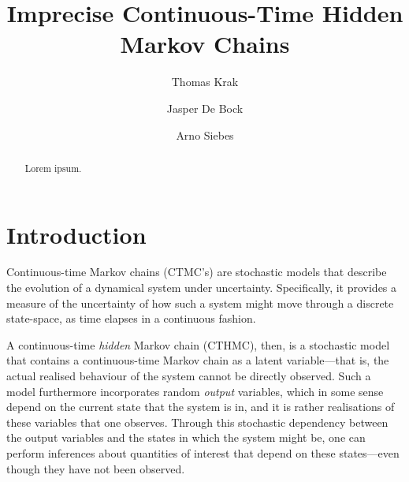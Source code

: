 \documentclass[twoside,11pt]{article}
\title{Imprecise Continuous-Time Hidden Markov Chains}
\author{Thomas Krak \and Jasper De Bock \and Arno Siebes}
\begin{document}


\date{}
\maketitle



\begin{abstract}
Lorem ipsum.
\end{abstract}

\section{Introduction}\label{sec:introduction}

Continuous-time Markov chains (CTMC's) are stochastic models that describe the evolution of a dynamical system under uncertainty. Specifically, it provides a measure of the uncertainty of how such a system might move through a discrete state-space, as time elapses in a continuous fashion.

A continuous-time \emph{hidden} Markov chain (CTHMC), then, is a stochastic model that contains a continuous-time Markov chain as a latent variable---that is, the actual realised behaviour of the system cannot be directly observed. Such a model furthermore incorporates random \emph{output} variables, which in some sense depend on the current state that the system is in, and it is rather realisations of these variables that one observes. Through this stochastic dependency between the output variables and the states in which the system might be, one can perform inferences about quantities of interest that depend on these states---even though they have not been observed.
\end{document}
